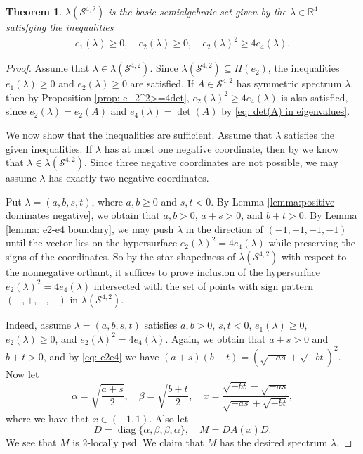 \documentclass[reqno,hidelinks,11pt]{amsart}
\numberwithin{equation}{section}
\newtheorem{theorem}{Theorem}[section]
\def\RR{\mathbb{R}}
\def\diag{\operatorname{diag}}
\def\S{\mathcal{S}}
\begin{document}
\begin{theorem}\label{theorem: l(S42)}
    $\lambda(\mathcal{S}^{4,2})$ is the basic semialgebraic set given by the $\lambda\in\RR^4$ satisfying the inequalities 
    \begin{align*}
        e_1(\lambda)\ge0,\quad
        e_2(\lambda)\ge0,\quad
        e_2(\lambda)^2\ge4e_4(\lambda).
    \end{align*}
\end{theorem}
\begin{proof}
    Assume that $\lambda \in \lambda(\S^{4, 2})$. Since $\lambda(\S^{4, 2}) \subseteq H(e_2)$, the inequalities $e_1(\lambda)\ge0$ and $e_2(\lambda)\ge0$ are satisfied. If $A \in \S^{4, 2}$ has symmetric spectrum $\lambda$, then by Proposition \ref{prop: e_2^2>=4det}, $e_2(\lambda)^2\ge4e_4(\lambda)$ is also satisfied, since $e_2(\lambda)=e_2(A)$ and $e_4(\lambda)=\det(A)$ by \eqref{eq: det(A) in eigenvalues}. 
    
    We now show that the inequalities are sufficient. Assume that $\lambda$ satisfies the given inequalities. If $\lambda$ has at most one negative coordinate, then by \cite[Corollary~1.5]{kozhasov2023eigenvalues} we know that $\lambda \in \lambda(\S^{4, 2})$. Since three negative coordinates are not possible, we may assume $\lambda$ has exactly two negative coordinates.
    
    Put $\lambda = (a, b, s, t)$, where $a, b \geq 0$ and $s, t < 0$. By Lemma \ref{lemma:positive dominates negative}, we obtain that $a, b > 0$, $a + s > 0$, and  $b + t > 0$. By Lemma \ref{lemma: e2-e4 boundary}, we may push $\lambda$ in the direction of $(-1, -1, -1, -1)$ until the vector lies on the hypersurface $e_2(\lambda)^2 = 4e_4(\lambda)$ while preserving the signs of the coordinates. So by the star-shapedness of $\lambda(\S^{4, 2})$ with respect to the nonnegative orthant, it suffices to prove inclusion of the hypersurface $e_2(\lambda)^2 = 4e_4(\lambda)$ intersected with the set of points with sign pattern $(+,+,-,-)$ in $\lambda(\S^{4, 2})$.
    
    Indeed, assume $\lambda = (a, b, s, t)$ satisfies $a,  b > 0$, $s, t < 0$, $e_1(\lambda) \geq 0$, $e_2(\lambda) \geq 0$, and $e_2(\lambda)^2 = 4e_4(\lambda)$. Again, we obtain that $a + s > 0$ and $b + t > 0$, and by \eqref{eq: e2e4} we have $
    (a + s)(b + t) = (\sqrt{-as} + \sqrt{-bt})^2$.
    Now let
    \[
    \alpha = \sqrt{\frac{a + s}2}, \quad \beta  = \sqrt{\frac{b + t}2}, \quad x = \frac{\sqrt{-bt} - \sqrt{-as}}{\sqrt{-as} + \sqrt{-bt}},
    \]
    where we have that $x \in (-1, 1)$. Also let
    \[
    D = \diag\{\alpha, \beta, \beta, \alpha\}, \quad M = DA(x)D.
    \]
    We see that $M$ is 2-locally psd. We claim that $M$ has the desired spectrum $\lambda$.


\end{proof}
\end{document}
